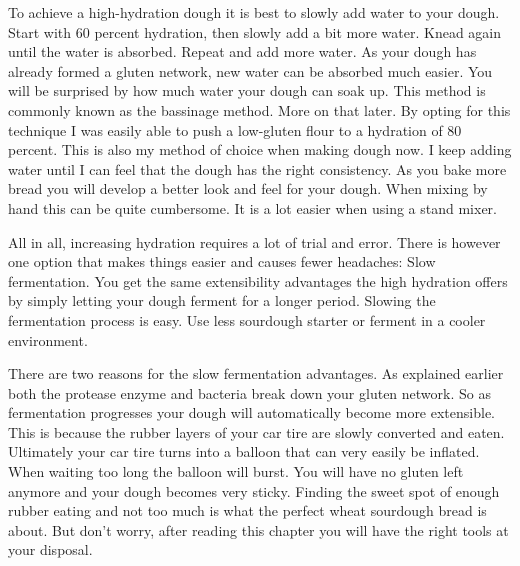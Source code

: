 To achieve a high-hydration dough it is best to slowly add water to
your dough. Start with 60 percent hydration, then slowly add a bit more water. Knead
again until the water is absorbed. Repeat and add more water. As your dough
has already formed a gluten network, new water can be absorbed much easier.
You will be surprised by how much water your dough can soak up. This
method is commonly known as the bassinage method. More on that later.
By opting for this technique I was easily able to push a low-gluten flour to a hydration of 80 percent. This
is also my method of choice when making dough now. I keep adding water until
I can feel that the dough has the right consistency. As you bake more bread
you will develop a better look and feel for your dough. When mixing
by hand this can be quite cumbersome. It is a lot easier when using a stand
mixer.

All in all, increasing hydration requires a lot of trial and error. There
is however one option that makes things easier and causes fewer headaches:
Slow fermentation. You get the same extensibility advantages the high hydration
offers by simply letting your dough ferment for a longer period.
Slowing the fermentation process is easy. Use less
sourdough starter or ferment in a cooler environment. 

There are two reasons for the slow fermentation advantages.
As explained earlier both the protease enzyme and bacteria break down your
gluten network. So as fermentation progresses your dough will automatically
become more extensible. This is because the rubber layers of your car tire
are slowly converted and eaten. Ultimately your car tire turns into a balloon
that can very easily be inflated.  When waiting too long the
balloon will burst. You will have no gluten left anymore and your dough
becomes very sticky. Finding the sweet spot of enough rubber eating and not
too much is what the perfect wheat sourdough bread is about. But don't worry, after reading
this chapter you will have the right tools at your disposal.

